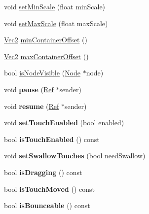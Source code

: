 \begin{DoxyCompactItemize}
\item 
void \hyperlink{classScrollView_a4037050171ea3ffcd365024ef3e74009}{set\+Min\+Scale} (float min\+Scale)
\item 
void \hyperlink{classScrollView_a8ec505c49d181c320f88cadbd2be5785}{set\+Max\+Scale} (float max\+Scale)
\item 
\hyperlink{classVec2}{Vec2} \hyperlink{classScrollView_a53daf6cba39b0e1340d66728394c6a41}{min\+Container\+Offset} ()
\item 
\hyperlink{classVec2}{Vec2} \hyperlink{classScrollView_a0c3c4cc77fc7af466bfc3cccd6b1b122}{max\+Container\+Offset} ()
\item 
bool \hyperlink{classScrollView_a0605de8c4ddbb06479cfdb8eee65e41e}{is\+Node\+Visible} (\hyperlink{classNode}{Node} $\ast$node)
\item 
\mbox{\label{classScrollView_a8e0243782ea8fba9fca1909c47b5acca}} 
void {\bfseries pause} (\hyperlink{classRef}{Ref} $\ast$sender)
\item 
\mbox{\label{classScrollView_aecbf33a1806c9416e145b6bdfa34d87f}} 
void {\bfseries resume} (\hyperlink{classRef}{Ref} $\ast$sender)
\item 
\mbox{\label{classScrollView_a5ba7f6eb8537a9bd30b2026227a5631a}} 
void {\bfseries set\+Touch\+Enabled} (bool enabled)
\item 
\mbox{\label{classScrollView_a963d2bacb68ccefbb5dfffcf88a5a7b5}} 
bool {\bfseries is\+Touch\+Enabled} () const
\item 
\mbox{\label{classScrollView_a1aacddfc45fb0299b53764001c5b6cf2}} 
void {\bfseries set\+Swallow\+Touches} (bool need\+Swallow)
\item 
\mbox{\label{classScrollView_ae9307d50e4ca9ca19731400b6f801363}} 
bool {\bfseries is\+Dragging} () const
\item 
\mbox{\label{classScrollView_aad09fb7b94c104e83ef8b499552aa805}} 
bool {\bfseries is\+Touch\+Moved} () const
\item 
\mbox{\label{classScrollView_ac3086ac241a29eb9ce311043506238e1}} 
bool {\bfseries is\+Bounceable} () const

\end{DoxyCompactItemize}
